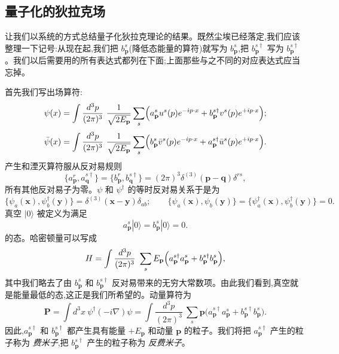 \subsection{量子化的狄拉克场}

让我们以系统的方式总结量子化狄拉克理论的结果。既然尘埃已经落定,我们应该整理一下记号:从现在起,我们把 $b_{\mathbf{p}}^s$(降低态能量的算符)就写为 $b_{\mathbf{p}}^s$,把 $b_{\mathbf{p}}^{s\dagger}$ 写为 $b_{\mathbf{p}}^{s\dagger}$。我们以后需要用的所有表达式都列在下面;上面那些与之不同的对应表达式应当忘掉。

首先我们写出场算符:
\begin{equation}
  \psi(x) = \int \frac{d^3p}{(2\pi)^3}\ \frac{1}{\sqrt{2E_{\mathbf{p}}}}
    \sum_s \Bigl( a_{\mathbf{p}}^s u^s(p)e^{-ip\cdot x}
      + b_{\mathbf{p}}^{s\dagger} v^s(p)e^{+ip\cdot x} \Bigr);
  \label{eq:3.101}
\end{equation}
\begin{equation}
  \bar{\psi}(x) = \int \frac{d^3p}{(2\pi)^3}\ \frac{1}{\sqrt{2E_{\mathbf{p}}}}
    \sum_s \Bigl( b_{\mathbf{p}}^s \bar{v}^s(p)e^{-ip\cdot x}
      + a_{\mathbf{p}}^{s\dagger} \bar{u}^s(p)e^{+ip\cdot x} \Bigr).
  \label{eq:3.102}
\end{equation}
产生和湮灭算符服从反对易规则
\begin{equation}
  \{a_{\mathbf{p}}^r, a_{\mathbf{q}}^{s\dagger}\}
  = \{b_{\mathbf{p}}^r, b_{\mathbf{q}}^{s\dagger}\}
    = (2\pi)^3\delta^{(3)}(\mathbf{p}-\mathbf{q})\delta^{rs},
  \label{eq:3.103}
\end{equation}
所有其他反对易子为零。$\psi$ 和 $\psi^\dagger$ 的等时反对易关系于是为
\begin{equation}
  \{\psi_a(\mathbf{x}), \psi_b^\dagger(\mathbf{y})\}
    = \delta^{(3)}(\mathbf{x}-\mathbf{y})\delta_{ab};
  \qquad
  \{\psi_a(\mathbf{x}), \psi_b(\mathbf{y})\}
  = \{\psi_a^\dagger(\mathbf{x}), \psi_b^\dagger(\mathbf{y})\} = 0 .
  \label{eq:3.104}
\end{equation}
真空 $|0\rangle$ 被定义为满足
\begin{equation}
  a_{\mathbf{p}}^s|0\rangle = b_{\mathbf{p}}^s|0\rangle = 0 .
  \label{eq:3.105}
\end{equation}
的态。哈密顿量可以写成
\begin{equation}
  H = \int \frac{d^3p}{(2\pi)^3}\ \sum_s E_{\mathbf{p}}
    \Bigl( a_{\mathbf{p}}^{s\dagger}a_{\mathbf{p}}^s
      + b_{\mathbf{p}}^{s\dagger}b_{\mathbf{p}}^s \Bigr),
  \label{eq:3.106}
\end{equation}
其中我们略去了由 $b_{\mathbf{p}}^s$ 和 $b_{\mathbf{p}}^{s\dagger}$ 反对易带来的无穷大常数项。由此我们看到,真空就是能量最低的态,这正是我们所希望的。动量算符为
\begin{equation}
  \mathbf{P} = \int d^3x\ \psi^\dagger(-i\nabla)\psi
    = \int \frac{d^3p}{(2\pi)^3}\ \sum_s \mathbf{p}
      \bigl( a_{\mathbf{p}}^{s\dagger}a_{\mathbf{p}}^s
        + b_{\mathbf{p}}^{s\dagger}b_{\mathbf{p}}^s \bigr).
  \label{eq:3.107}
\end{equation}
因此,$a_{\mathbf{p}}^{s\dagger}$ 和 $b_{\mathbf{p}}^{s\dagger}$ 都产生具有能量 $+E_{\mathbf{p}}$ 和动量 $\mathbf{p}$ 的粒子。我们将把 $a_{\mathbf{p}}^{s\dagger}$ 产生的粒子称为 \emph{费米子},把 $b_{\mathbf{p}}^{s\dagger}$ 产生的粒子称为 \emph{反费米子}。

